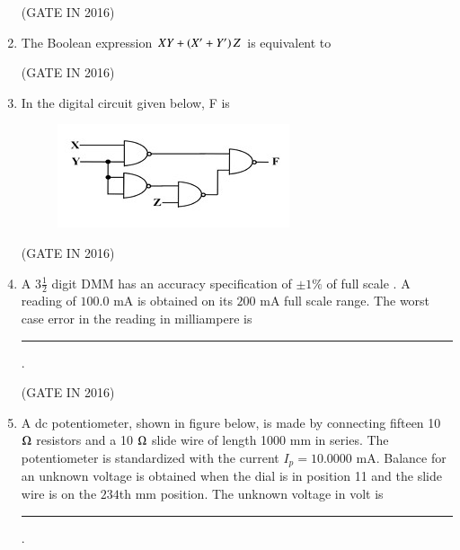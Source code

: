 \documentclass[journal,12pt,onecolumn]{IEEEtran}
\theoremstyle{remark}
\begin{document}
\begin{enumerate}
\hfill{(GATE IN 2016)}

\item The Boolean expression $XY + \left( X'+ Y' \right)Z$ is equivalent to

\hfill{(GATE IN 2016)}
\begin{enumerate}
\end{enumerate}

\item In the digital circuit given below, F is
\begin{figure}[H]
\centering
\includegraphics[width=0.4\columnwidth]{figs/z9.jpg}
\caption*{}
\label{fig:z9}
\end{figure}

\hfill{(GATE IN 2016)}
\begin{enumerate}
\end{enumerate}

\item A $3\frac{1}{2}$ digit DMM has an accuracy specification of $\pm 1\%$ of full scale . A reading of $100.0$ mA is obtained on its $200$ mA full scale range. The worst case error in the reading in milliampere is \rule{2cm}{0.4pt}.

\hfill{(GATE IN 2016)}

\item  A dc potentiometer, shown in figure below, is made by connecting fifteen 10 $\ohm$ resistors and a 10 $\ohm$ slide wire of length 1000 mm in series. The potentiometer is standardized with the current $I_p = 10.0000$ mA. Balance for an unknown voltage is obtained when the dial is in position 11  and the slide wire is on the $234$th mm position. The unknown voltage  in volt is \rule{2cm}{0.4pt}.


\end{enumerate}
\end{document}
